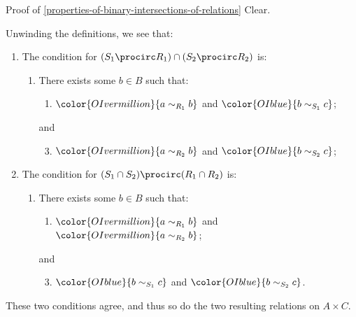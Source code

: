 \begin{Proof}{Proof of \cref{properties-of-binary-intersections-of-relations}}%
    Clear.

    Unwinding the definitions, we see that:
    \begin{enumerate}
        \item The condition for $(S_{1}\procirc R_{1})\cap(S_{2}\procirc R_{2})$ is:
            \begin{enumerate}
                \item There exists some $b\in B$ such that:
                    \begin{enumerate}
                        \item $\color{OIvermillion}{a\sim_{R_{1}}b}$ and $\color{OIblue}{b\sim_{S_{1}}c}$;
                    \end{enumerate}
                    and
                    \begin{enumerate}\setcounter{enumi}{2}
                        \item $\color{OIvermillion}{a\sim_{R_{2}}b}$ and $\color{OIblue}{b\sim_{S_{2}}c}$;
                    \end{enumerate}
            \end{enumerate}
        \item The condition for $(S_{1}\cap S_{2})\procirc(R_{1}\cap R_{2})$ is:
            \begin{enumerate}
                \item There exists some $b\in B$ such that:
                    \begin{enumerate}
                        \item $\color{OIvermillion}{a\sim_{R_{1}}b}$ and $\color{OIvermillion}{a\sim_{R_{2}}b}$;
                    \end{enumerate}
                    and
                    \begin{enumerate}\setcounter{enumi}{2}
                        \item $\color{OIblue}{b\sim_{S_{1}}c}$ and $\color{OIblue}{b\sim_{S_{2}}c}$.
                    \end{enumerate}
            \end{enumerate}
    \end{enumerate}
    These two conditions agree, and thus so do the two resulting relations on $A\times C$.
\end{Proof}
